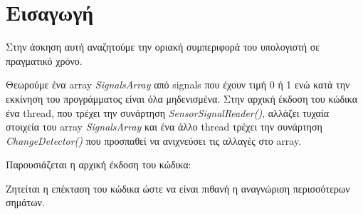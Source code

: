 \chapter{Εισαγωγή}

Στην άσκηση αυτή αναζητούμε την οριακή συμπεριφορά του υπολογιστή σε πραγματικό 
χρόνο.

Θεωρούμε ένα array \textit{SignalsArray} από signals που έχουν τιμή 0 
ή 1 ενώ κατά την εκκίνηση του προγράμματος είναι όλα μηδενισμένα. Στην αρχική 
έκδοση του 
κώδικα ένα thread, που τρέχει την συνάρτηση \textit{SensorSignalReader()}, 
αλλάζει τυχαία στοιχεία του array 
\textit{SignalsArray} και ένα άλλο thread τρέχει την συνάρτηση 
\textit{ChangeDetector()} που προσπαθεί να ανιχνεύσει τις αλλαγές στο array.

Παρουσιάζεται η αρχική έκδοση του κώδικα:



Ζητείται η επέκταση του κώδικα ώστε να είναι πιθανή η αναγνώριση περισσότερων 
σημάτων.